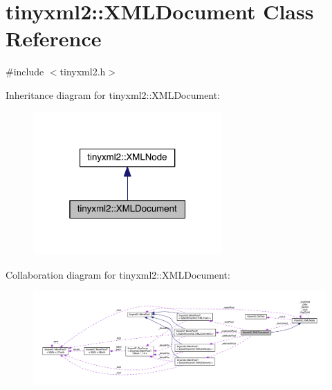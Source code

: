 \hypertarget{classtinyxml2_1_1_x_m_l_document}{}\section{tinyxml2\+:\+:X\+M\+L\+Document Class Reference}
\label{classtinyxml2_1_1_x_m_l_document}


{\ttfamily \#include $<$tinyxml2.\+h$>$}



Inheritance diagram for tinyxml2\+:\+:X\+M\+L\+Document\+:\nopagebreak
\begin{figure}[H]
\begin{center}
\leavevmode
\includegraphics[width=205pt]{classtinyxml2_1_1_x_m_l_document__inherit__graph}
\end{center}
\end{figure}


Collaboration diagram for tinyxml2\+:\+:X\+M\+L\+Document\+:\nopagebreak
\begin{figure}[H]
\begin{center}
\leavevmode
\includegraphics[width=350pt]{classtinyxml2_1_1_x_m_l_document__coll__graph}
\end{center}
\end{figure}
